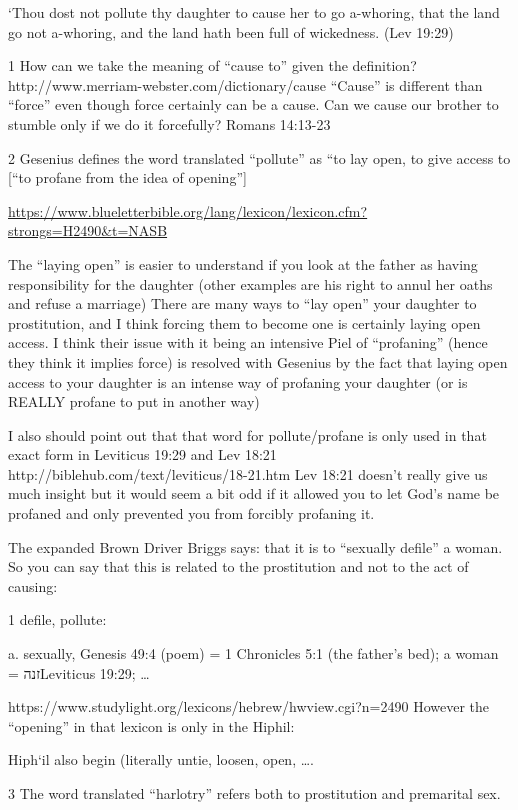 \documentclass[11pt]{article}
\begin{document}
{`Thou dost not pollute thy daughter to cause her to go a-whoring, that the land go not a-whoring, and the land hath been full of wickedness. (Lev 19:29)

1 How can we take the meaning of “cause to” given the definition? http://www.merriam-webster.com/dictionary/cause “Cause” is different than “force” even though force certainly can be a cause. Can we cause our brother to stumble only if we do it forcefully? Romans 14:13-23

2 Gesenius defines the word translated “pollute” as “to lay open, to give access to [“to profane from the idea of opening”]


\url{https://www.blueletterbible.org/lang/lexicon/lexicon.cfm?strongs=H2490&t=NASB}

The “laying open” is easier to understand if you look at the father as having responsibility for the daughter (other examples are his right to annul her oaths and refuse a marriage) There are many ways to “lay open” your daughter to prostitution, and I think forcing them to become one is certainly laying open access. I think their issue with it being an intensive Piel of “profaning” (hence they think it implies force) is resolved with Gesenius by the fact that laying open access to your daughter is an intense way of profaning your daughter (or is REALLY profane to put in another way)

I also should point out that that word for pollute/profane is only used in that exact form in Leviticus 19:29 and Lev 18:21
http://biblehub.com/text/leviticus/18-21.htm Lev 18:21 doesn’t really give us much insight but it would seem a bit odd if it allowed you to let God’s name be profaned and only prevented you from forcibly profaning it.

The expanded Brown Driver Briggs says: that it is to “sexually defile” a woman. So you can say that this is related to the prostitution and not to the act of causing:

1 defile, pollute:

a. sexually, Genesis 49:4 (poem) = 1 Chronicles 5:1 (the father’s bed); a woman = זנהLeviticus 19:29; …

https://www.studylight.org/lexicons/hebrew/hwview.cgi?n=2490﻿
However the “opening” in that lexicon is only in the Hiphil:

Hiph`il also begin (literally untie, loosen, open, ….

3 The word translated “harlotry” refers both to prostitution and premarital sex.

}
\end{document}
